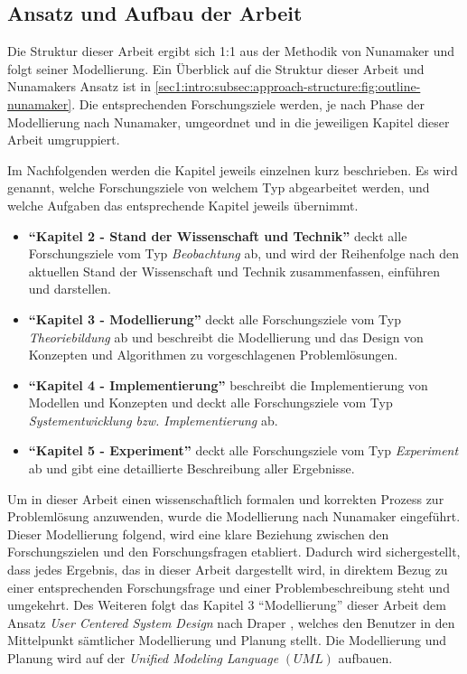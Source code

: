 \subsection{Ansatz und Aufbau der Arbeit}
\label{sec1:intro:subsec:approach-structure}
Die Struktur dieser Arbeit ergibt sich 1:1 aus der Methodik von Nunamaker \cite{nunamaker} und folgt seiner Modellierung.
Ein Überblick auf die Struktur dieser Arbeit und Nunamakers Ansatz ist in \cref{sec1:intro:subsec:approach-structure:fig:outline-nunamaker}.
Die entsprechenden Forschungsziele werden, je nach Phase der Modellierung nach Nunamaker, umgeordnet und in die jeweiligen Kapitel dieser Arbeit umgruppiert.
\clearpage


Im Nachfolgenden werden die Kapitel jeweils einzelnen kurz beschrieben. Es wird genannt, welche Forschungsziele von welchem Typ abgearbeitet werden, und welche Aufgaben das entsprechende Kapitel jeweils übernimmt.
\begin{itemize}
    \setlength{\itemsep}{0pt}
    \item \textbf{\enquote{Kapitel 2 - Stand der Wissenschaft und Technik}} deckt alle Forschungsziele vom Typ \textit{Beobachtung} ab, und wird der Reihenfolge nach den aktuellen Stand der Wissenschaft und Technik zusammenfassen, einführen und darstellen.
    \item \textbf{\enquote{Kapitel 3 - Modellierung}} deckt alle Forschungsziele vom Typ \textit{Theoriebildung} ab und beschreibt die Modellierung und das Design von Konzepten und Algorithmen zu vorgeschlagenen Problemlösungen.
    \item \textbf{\enquote{Kapitel 4 - Implementierung}} beschreibt die Implementierung von Modellen und Konzepten und deckt alle Forschungsziele vom Typ \textit{Systementwicklung bzw. Implementierung} ab.
    \item \textbf{\enquote{Kapitel 5 - Experiment}} deckt alle Forschungsziele vom Typ \textit{Experiment} ab und gibt eine detaillierte Beschreibung aller Ergebnisse.
\end{itemize}
\noindent
Um in dieser Arbeit einen wissenschaftlich formalen und korrekten Prozess zur Problemlösung anzuwenden, wurde die Modellierung nach Nunamaker eingeführt.
Dieser Modellierung folgend, wird eine klare Beziehung zwischen den Forschungszielen und den Forschungsfragen etabliert.
Dadurch wird sichergestellt, dass jedes Ergebnis, das in dieser Arbeit dargestellt wird, in direktem Bezug zu einer entsprechenden Forschungsfrage und einer Problembeschreibung steht und umgekehrt.
Des Weiteren folgt das Kapitel 3 \enquote{Modellierung} dieser Arbeit dem Ansatz \textit{User Centered System Design} nach Draper \cite{norman-draper-user-centered-system-design}, welches den Benutzer in den Mittelpunkt sämtlicher Modellierung und Planung stellt.
Die Modellierung und Planung wird auf der \textit{Unified Modeling Language} $(UML)$ \cite{uml} aufbauen.

